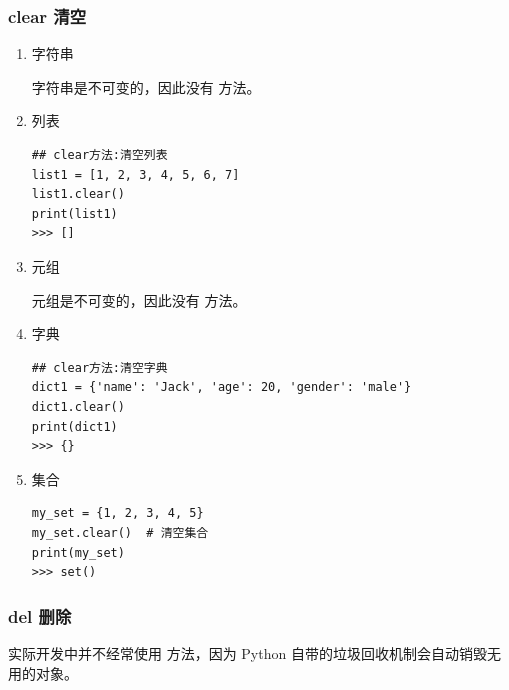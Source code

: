 \subsubsection{clear 清空}
\begin{enumerate}[label=\arabic*)]
    \item 字符串

    字符串是不可变的，因此没有  方法。

    \item 列表

\begin{lstlisting}[style=demostyle,numbers=none]
## clear方法:清空列表
list1 = [1, 2, 3, 4, 5, 6, 7]
list1.clear()
print(list1)
>>> []
\end{lstlisting}

    \item 元组

    元组是不可变的，因此没有  方法。

    \item 字典
\begin{lstlisting}[style=demostyle,numbers=none]
## clear方法:清空字典
dict1 = {'name': 'Jack', 'age': 20, 'gender': 'male'}
dict1.clear()
print(dict1)
>>> {}
\end{lstlisting}

    \item 集合

\begin{lstlisting}[style=demostyle,numbers=none]
my_set = {1, 2, 3, 4, 5}
my_set.clear()  # 清空集合
print(my_set)  
>>> set()
\end{lstlisting}
\end{enumerate}

\subsubsection{del 删除}
实际开发中并不经常使用  方法，因为 Python 自带的垃圾回收机制会自动销毁无用的对象。

